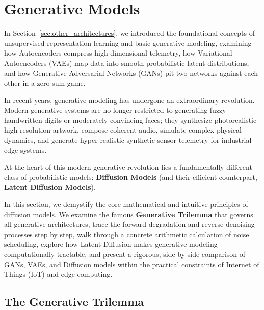 \section{Generative Models}\label{sec:generative_models}

In Section~\ref{sec:other_architectures}, we introduced the foundational concepts of unsupervised representation learning and basic generative modeling, examining how Autoencoders compress high-dimensional telemetry, how Variational Autoencoders (VAEs) map data into smooth probabilistic latent distributions, and how Generative Adversarial Networks (GANs) pit two networks against each other in a zero-sum game.

In recent years, generative modeling has undergone an extraordinary revolution. Modern generative systems are no longer restricted to generating fuzzy handwritten digits or moderately convincing faces; they synthesize photorealistic high-resolution artwork, compose coherent audio, simulate complex physical dynamics, and generate hyper-realistic synthetic sensor telemetry for industrial edge systems.

At the heart of this modern generative revolution lies a fundamentally different class of probabilistic models: \textbf{Diffusion Models} (and their efficient counterpart, \textbf{Latent Diffusion Models}).

In this section, we demystify the core mathematical and intuitive principles of diffusion models. We examine the famous \textbf{Generative Trilemma} that governs all generative architectures, trace the forward degradation and reverse denoising processes step by step, walk through a concrete arithmetic calculation of noise scheduling, explore how Latent Diffusion makes generative modeling computationally tractable, and present a rigorous, side-by-side comparison of GANs, VAEs, and Diffusion models within the practical constraints of Internet of Things (IoT) and edge computing.

\subsection{The Generative Trilemma}\label{subsec:generative_trilemma}

